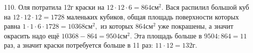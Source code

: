 110. Оля потратила 12г краски на $12\cdot12\cdot6=864\text{см}^2.$ Вася распилил большой куб на $12\cdot12\cdot12=1728$ маленьких кубиков, общая площадь поверхности которых равна $1\cdot1\cdot6\cdot1728=10368\text{см}^2,$ из которых $864\text{см}^2$ уже покрашены, а значит окрасить надо ещё $10368-864=9504\text{см}^2.$ Эта площадь больше в $9504:864=11$ раз, а значит краски потребуется больше в 11 раз: $11\cdot12=132$г.\\

